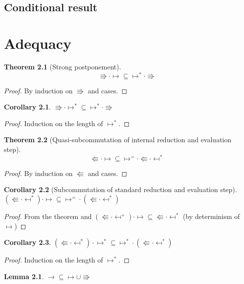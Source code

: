 \documentclass[a4paper, 11pt,titlepage, openright, twoside]{report}
\newcommand{\+}{\enspace}
\newtheorem{corollary}{Corollary}
\newtheorem{lemma}{Lemma}
\newtheorem{theorem}{Theorem}
\begin{document}
\section{Conditional result}


\chapter{Adequacy}

\begin{theorem}[Strong postponement]
	$${\Rrightarrow · ↦} ⊆ {↦^* · \Rrightarrow}$$
\end{theorem}
\begin{proof}
	By induction on $\Rrightarrow$ and cases.
\end{proof}
\begin{corollary}
	${\Rrightarrow · ↦^*} ⊆ {↦^* · \Rrightarrow}$
\end{corollary}
\begin{proof}
	Induction on the length of $↦^*$.
\end{proof}

\begin{theorem}[Quasi-subcommutation of internal reduction and evaluation step]
 \label{quasisubcomm} 
	$${\Lleftarrow · ↦ } ⊆ {↦^= · \Lleftarrow · \mapsfrom^*}$$
\end{theorem}
\begin{proof}
	By induction on $\Lleftarrow$ and cases.
\end{proof}
\begin{corollary}[Subcommutation of standard reduction and evaluation step] \item
	${(\Lleftarrow · \mapsfrom^*) · ↦} ⊆ {↦^= \mathbin{·} ({{\Lleftarrow} · \mapsfrom^*})}$
\end{corollary}
\begin{proof}
	From the theorem %
	and
	${(\Lleftarrow · \mapsfrom^+) · ↦} ⊆ {{{\Lleftarrow} · \mapsfrom^*}}$ (by determinism of $↦$)
\end{proof}
\begin{corollary}
	${(\Lleftarrow · \mapsfrom^*) · ↦^*} ⊆ {↦^* \mathbin{·} ({{\Lleftarrow} · \mapsfrom^*})}$
\end{corollary}
\begin{proof}
	Induction on the length of $↦^*$.
\end{proof}



\begin{lemma}
	${→} ⊆ {↦ ∪ \Rrightarrow}$
\end{lemma}
\end{document}
